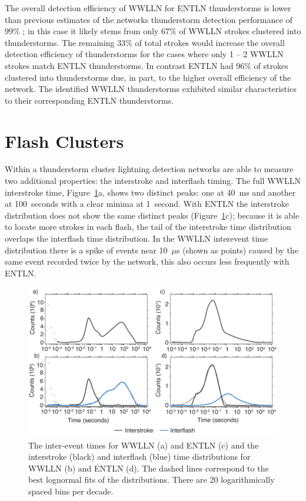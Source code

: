 The overall detection efficiency of WWLLN for ENTLN thunderstorms is lower than previous estimates of the networks thunderstorm detection performance of 99\% \citep{Jacobson2006c}; in this case it likely stems from only 67\% of WWLLN strokes clustered into thunderstorms.
The remaining 33\% of total strokes would increase the overall detection efficiency of thunderstorms for the cases where only 1 -- 2 WWLLN strokes match ENTLN thunderstorms.
In contrast ENTLN had 96\% of strokes clustered into thunderstorms due, in part, to the higher overall efficiency of the network.
The identified WWLLN thunderstorms exhibited similar characteristics to their corresponding ENTLN thunderstorms.

\section{Flash Clusters}
\label{thunderstorm:sec:interflash}

Within a thunderstorm cluster lightning detection networks are able to measure two additional properties: the interstroke and interflash timing.
The full WWLLN interstroke time, Figure~\ref{thunderstorm:fig:interflash}a, shows two distinct peaks: one at 40~ms and another at 100~seconds with a clear minima at 1~second.
With ENTLN the interstroke distribution does not show the same distinct peaks (Figure~\ref{thunderstorm:fig:interflash}c); because it is able to locate more strokes in each flash, the tail of the interstroke time distribution overlaps the interflash time distribution.
In the WWLLN interevent time distribution there is a spike of events near 10~$\mu$s (shown as points) caused by the same event recorded twice by the network, this also occurs less frequently with ENTLN.

\begin{figure}[ht!]
   \centering
   \includegraphics[scale=1]{thunderstorm/Figures/interflash.pdf}
   \caption{The inter-event times for WWLLN (a) and ENTLN (c) and the interstroke (black) and interflash (blue) time distributions for WWLLN (b) and ENTLN (d).
           The dashed lines correspond to the best lognormal fits of the distributions.
           There are 20 logarithmically spaced bins per decade.}
   \label{thunderstorm:fig:interflash}
\end{figure}

